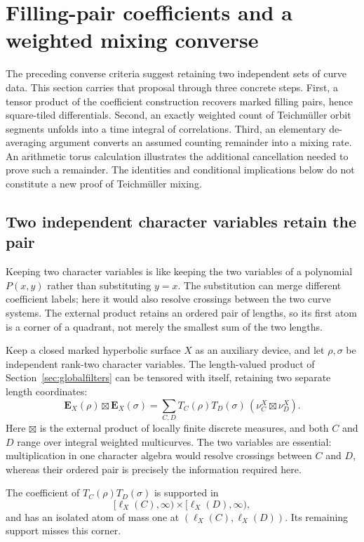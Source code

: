 \section{Filling-pair coefficients and a weighted mixing converse}
\label{sec:pairconverse}

The preceding converse criteria suggest retaining two independent
sets of curve data.  This section carries that proposal through three
concrete steps.  First, a tensor product of the coefficient construction
recovers marked filling pairs, hence square-tiled differentials.
Second, an exactly weighted count of Teichm\"uller orbit segments
unfolds into a time integral of correlations.  Third, an elementary
de-averaging argument converts an assumed counting remainder into
a mixing rate.  An arithmetic torus calculation illustrates the
additional cancellation needed to prove such a remainder.  The
identities and conditional implications below do not constitute a new
proof of Teichm\"uller mixing.

\subsection{Two independent character variables retain the pair}
\label{subsec:paircoefficients}

Keeping two character variables is like keeping the two variables
of a polynomial $P(x,y)$ rather than substituting $y=x$.
The substitution can merge different coefficient labels; here it
would also resolve crossings between the two curve systems.
The external product retains an ordered pair of lengths, so its
first atom is a corner of a quadrant, not merely the smallest sum
of the two lengths.

Keep a closed marked hyperbolic surface $X$ as an auxiliary device,
and let $\rho,\sigma$ be independent rank-two character variables.
The length-valued product of Section~\ref{sec:globalfilters} can be
tensored with itself, retaining two separate length coordinates:
\[
 \mathbf E_X(\rho)\boxtimes\mathbf E_X(\sigma)
 =\sum_{C,D} T_C(\rho)T_D(\sigma)\,
       (\nu_C^X\boxtimes\nu_D^X).
\]
Here $\boxtimes$ is the external product of locally finite discrete
measures, and both $C$ and $D$ range over integral weighted
multicurves.  The two variables are essential: multiplication in
one character algebra would resolve crossings between $C$ and $D$,
whereas their ordered pair is precisely the information required here.

\begin{proposition}
\label{prop:pairfirstcorner}
The coefficient of $T_C(\rho)T_D(\sigma)$ is supported in
\[
 [\ell_X(C),\infty)\times[\ell_X(D),\infty),
\]
and has an isolated atom of mass one at
$(\ell_X(C),\ell_X(D))$.  Its remaining support misses this corner.
\end{proposition}

